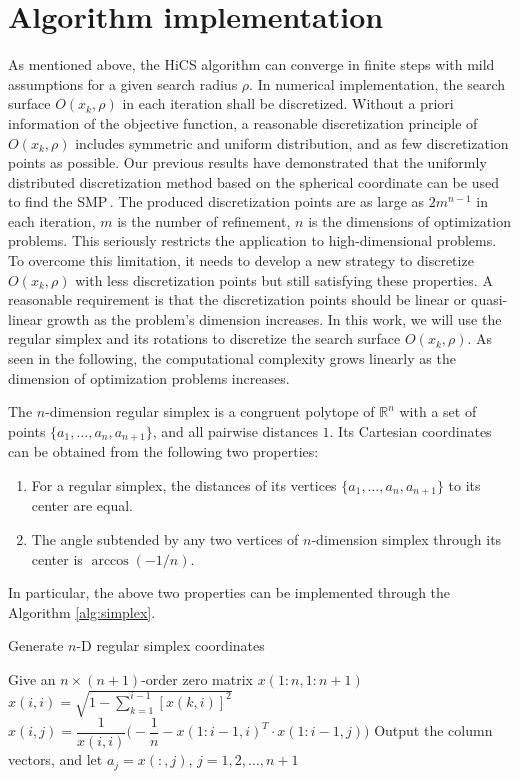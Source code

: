 \documentclass[final,1p,times]{elsarticle}
\begin{document}
\section{Algorithm implementation}
\label{sec:implement}

As mentioned above, the HiCS algorithm can converge in  
finite steps with mild assumptions for a given search radius $\rho$.
In numerical implementation, the search surface $O(x_k,\rho)$ in
each iteration shall be discretized.
Without a priori information of the objective function,
a reasonable discretization principle of $O(x_k,\rho)$
includes symmetric and uniform distribution, and as few
discretization points as possible.
Our previous results have demonstrated that the uniformly distributed
discretization method based on the spherical coordinate
can be used to find the SMP\,\cite{huang2017hill}. 
The produced discretization points are as large as $2m^{n-1}$ in
each iteration, $m$ is the number of refinement, $n$ is the dimensions of
optimization problems. This seriously restricts the
application to high-dimensional problems. 
To overcome this limitation, it needs to develop a new
strategy to discretize $O(x_k,\rho)$ with less discretization points
but still satisfying these properties.
A reasonable requirement is that the discretization points should be
linear or quasi-linear growth as the problem's dimension increases.
In this work, we will use the regular simplex and its rotations to
discretize the search surface $O(x_k,\rho)$. As seen in the following,
the computational complexity grows linearly as the
dimension of optimization problems increases.

The $n$-dimension regular simplex is a congruent polytope of
$\mathbb{R}^n$ with a set of points $\{a_1,\dots,a_n,a_{n+1}\}$,
and all pairwise distances $1$.
Its Cartesian coordinates can be obtained from the following two properties:
\begin{enumerate}
	\item For a regular simplex, the distances of its vertices 
		$\{a_1,\dots,a_n,a_{n+1}\}$ to its center are equal.
	\item The angle subtended by any two vertices of $n$-dimension simplex through its center is
		$\arccos(-1/n)$.
\end{enumerate}
In particular, the above two properties can be implemented
through the Algorithm \ref{alg:simplex}.
\begin{algorithm}
	\caption{Generate $n$-D regular simplex coordinates} 
	\label{alg:simplex}
\begin{algorithmic}
	\STATE Give an $n\times(n+1)$-order zero matrix $x(1:n,1:n+1)$
	\STATE $x(i,i)=\sqrt{1-\sum_{k=1}^{i-1} [x(k, i)]^{2}}$
		\STATE $x(i,j)
		=\dfrac{1}{x(i,i)}\Big(-\dfrac{1}{n}-x(1:i-1, i)^T \cdot
		x(1:i-1, j)\Big)$
		\ENDFOR
	\ENDFOR
	\STATE Output the column vectors, and let $a_j=x(:,j)$,
	$j=1,2,\dots,n+1$ 
\end{algorithmic}
\end{algorithm}
\end{document}
